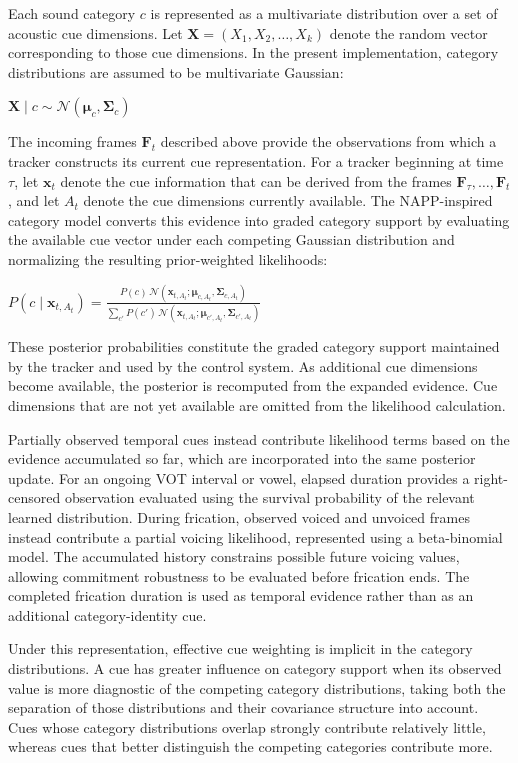 \documentclass[12pt]{article}
\begin{document}
Each sound category $c$ is represented as a multivariate distribution over a set of acoustic cue dimensions.
%
Let $\mathbf{X}=(X_1,X_2,\ldots,X_k)$ denote the random vector corresponding to those cue dimensions.
%
In the present implementation, category distributions are assumed to be multivariate Gaussian:
%
\begin{exe}
\ex $\mathbf{X} \mid c \sim \mathcal{N}(\boldsymbol{\mu}_c,\boldsymbol{\Sigma}_c)$
\end{exe}
%
The incoming frames $\mathbf{F}_t$ described above provide the observations from which a tracker constructs its current cue representation.
%
For a tracker beginning at time $\tau$, let $\mathbf{x}_t$ denote the cue information that can be derived from the frames $\mathbf{F}_{\tau},\ldots,\mathbf{F}_t$, and let $A_t$ denote the cue dimensions currently available.
%
The NAPP-inspired category model converts this evidence into graded category support by evaluating the available cue vector under each competing Gaussian distribution and normalizing the resulting prior-weighted likelihoods:
%
\begin{exe}
\ex $P(c \mid \mathbf{x}_{t,A_t}) =
\frac{
P(c)\,\mathcal{N}(\mathbf{x}_{t,A_t};
\boldsymbol{\mu}_{c,A_t},\boldsymbol{\Sigma}_{c,A_t})
}{
\sum_{c'} P(c')\,\mathcal{N}(\mathbf{x}_{t,A_t};
\boldsymbol{\mu}_{c',A_t},\boldsymbol{\Sigma}_{c',A_t})
}$
\end{exe}
%
These posterior probabilities constitute the graded category support maintained by the tracker and used by the control system.
%
As additional cue dimensions become available, the posterior is recomputed from the expanded evidence.
%
Cue dimensions that are not yet available are omitted from the likelihood calculation.

Partially observed temporal cues instead contribute likelihood terms based on the evidence accumulated so far, which are incorporated into the same posterior update.
%
For an ongoing VOT interval or vowel, elapsed duration provides a right-censored observation evaluated using the survival probability of the relevant learned distribution.
%
During frication, observed voiced and unvoiced frames instead contribute a partial voicing likelihood, represented using a beta-binomial model.
%
The accumulated history constrains possible future voicing values, allowing commitment robustness to be evaluated before frication ends.
%
The completed frication duration is used as temporal evidence rather than as an additional category-identity cue.

Under this representation, effective cue weighting is implicit in the category distributions.
%
A cue has greater influence on category support when its observed value is more diagnostic of the competing category distributions, taking both the separation of those distributions and their covariance structure into account.
%
Cues whose category distributions overlap strongly contribute relatively little, whereas cues that better distinguish the competing categories contribute more.
\end{document}

